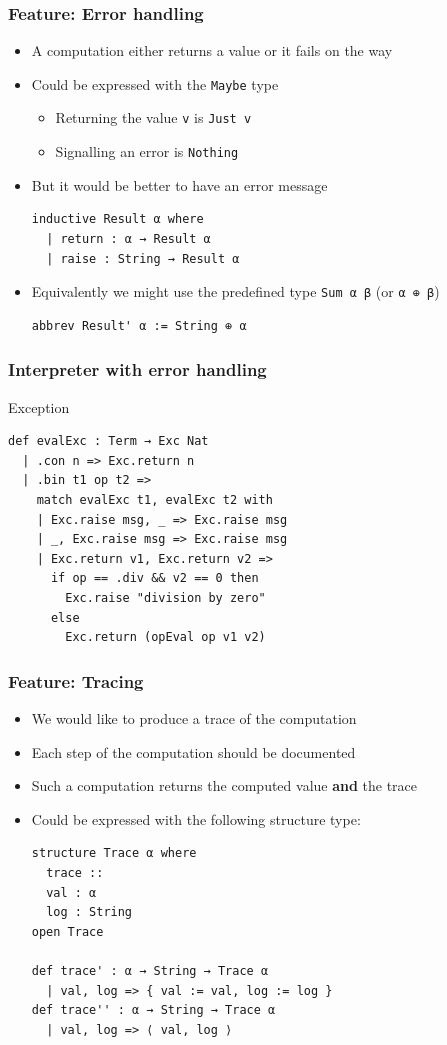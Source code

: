 \documentclass{beamer}
\begin{document}
\begin{frame}[fragile]
  \frametitle{Feature: Error handling}
  \begin{itemize}
  \item A computation either returns a value or it fails on the way
  \item Could be expressed with the \lstinline{Maybe} type
    \begin{itemize}
    \item Returning the value \lstinline{v} is \lstinline{Just v}
    \item Signalling an error is \lstinline{Nothing}
    \end{itemize}
  \item But it would be better to have an error message
\begin{lstlisting}
inductive Result α where
  | return : α → Result α
  | raise : String → Result α
\end{lstlisting}
  \item Equivalently we might use the  predefined type \lstinline{Sum α β} (or
    \lstinline{α ⊕ β})
\begin{lstlisting}
abbrev Result' α := String ⊕ α
\end{lstlisting}
  \end{itemize}
\end{frame}

\begin{frame}[fragile]
  \frametitle{Interpreter with error handling}
  \begin{block}{Exception}
\begin{lstlisting}
def evalExc : Term → Exc Nat
  | .con n => Exc.return n
  | .bin t1 op t2 =>
    match evalExc t1, evalExc t2 with
    | Exc.raise msg, _ => Exc.raise msg
    | _, Exc.raise msg => Exc.raise msg
    | Exc.return v1, Exc.return v2 =>
      if op == .div && v2 == 0 then
        Exc.raise "division by zero"
      else
        Exc.return (opEval op v1 v2)
\end{lstlisting}
\end{block}     
\end{frame}

\begin{frame}[fragile]
  \frametitle{Feature: Tracing}
  \begin{itemize}
  \item We would like to produce a trace of the computation
  \item Each step of the computation should be documented
  \item Such a computation returns the computed value \textbf{and} the
    trace
  \item Could be expressed with the following structure type:
\begin{lstlisting}
structure Trace α where
  trace ::
  val : α
  log : String
open Trace

def trace' : α → String → Trace α
  | val, log => { val := val, log := log }
def trace'' : α → String → Trace α
  | val, log => ⟨ val, log ⟩ 
\end{lstlisting}
  \end{itemize}
\end{frame}
\end{document}
